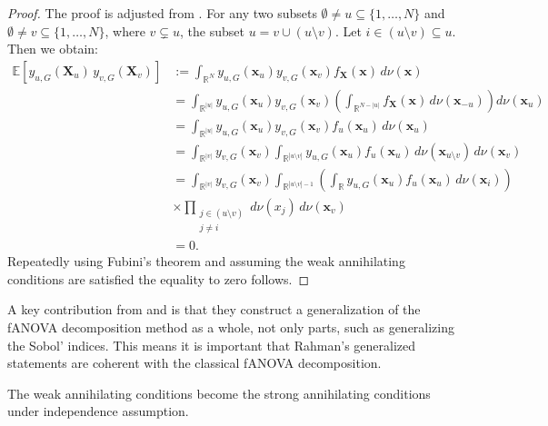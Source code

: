 \begin{proof}
The proof is adjusted from \cite{rahman2014}. For any two subsets $\emptyset \ne u \subseteq \{1,\dots,N\}$ and $\emptyset \ne v \subseteq \{1,\dots,N\}$, where $v \subsetneq u$, the subset $u = v \cup (u \setminus v)$. Let $i \in (u \setminus v) \subseteq u$. Then we obtain:
\begin{align*}
\mathbb{E}[y_{u,G}(\boldsymbol{X}_u) \, y_{v,G}(\boldsymbol{X}_v)]
&:= \int_{\mathbb{R}^N} y_{u,G}(\boldsymbol{x}_u) y_{v,G}(\boldsymbol{x}_v) f_{\boldsymbol{X}}(\boldsymbol{x}) \, d \nu(\boldsymbol{x}) \\[0.5em]
&= \int_{\mathbb{R}^{|u|}} y_{u,G}(\boldsymbol{x}_u) y_{v,G}(\boldsymbol{x}_v) \left( \int_{\mathbb{R}^{N - |u|}} f_{\boldsymbol{X}}(\boldsymbol{x}) \, d \nu(\boldsymbol{x}_{-u}) \right) d \nu(\boldsymbol{x}_u) \\[0.5em]
&= \int_{\mathbb{R}^{|u|}} y_{u,G}(\boldsymbol{x}_u) y_{v,G}(\boldsymbol{x}_v) f_u(\boldsymbol{x}_u) \, d \nu(\boldsymbol{x}_u) \\[0.5em]
&= \int_{\mathbb{R}^{|v|}} y_{v,G}(\boldsymbol{x}_v)
    \int_{\mathbb{R}^{|u \setminus v|}} y_{u,G}(\boldsymbol{x}_u) f_u(\boldsymbol{x}_u) \, d \nu(\boldsymbol{x}_{u \setminus v}) \, d \nu(\boldsymbol{x}_v) \\[0.5em]
&= \int_{\mathbb{R}^{|v|}} y_{v,G}(\boldsymbol{x}_v)
    \int_{\mathbb{R}^{|u \setminus v| - 1}} \left( \int_{\mathbb{R}} y_{u,G}(\boldsymbol{x}_u) f_u(\boldsymbol{x}_u) \, d \nu(\boldsymbol{x}_i) \right) \\[0.5em]
&\times \prod_{\substack{j \in (u \setminus v) \\ j \ne i}} d \nu(x_j) \, d \nu(\boldsymbol{x}_v) \\[0.5em]
&= 0.
\end{align*}
Repeatedly using Fubini's theorem and assuming the weak annihilating conditions are satisfied the equality to zero follows.
\end{proof}
A key contribution from \cite{hooker2007} and \cite{rahman2014} is that they construct a generalization of the fANOVA decomposition method as a whole, not only parts, such as generalizing the Sobol' indices.
This means it is important that Rahman's generalized statements are coherent with the classical fANOVA decomposition.
\begin{proposition}
    The weak annihilating conditions become the strong annihilating conditions under independence assumption.
    \label{prop:weak_strong}
\end{proposition}

